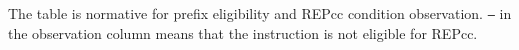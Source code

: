 The table is normative for prefix eligibility and REPcc condition observation. \texttt{--} in the observation column
means that the instruction is not eligible for REPcc.
